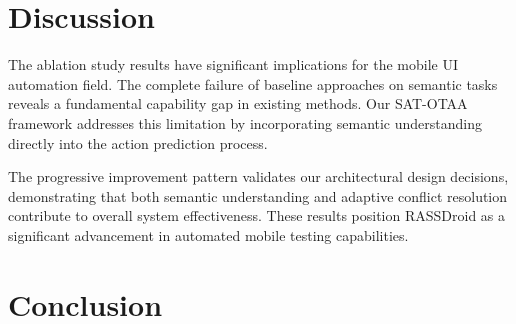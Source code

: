 \documentclass{article}
\begin{document}
\section{Discussion}

The ablation study results have significant implications for the mobile UI automation field. The complete failure of baseline approaches on semantic tasks reveals a fundamental capability gap in existing methods. Our SAT-OTAA framework addresses this limitation by incorporating semantic understanding directly into the action prediction process.

The progressive improvement pattern validates our architectural design decisions, demonstrating that both semantic understanding and adaptive conflict resolution contribute to overall system effectiveness. These results position RASSDroid as a significant advancement in automated mobile testing capabilities.

\section{Conclusion}

\end{document}
